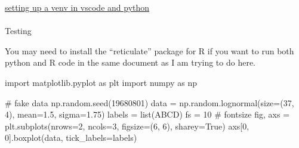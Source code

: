 \documentclass[
  letterpaper,
  DIV=11,
  numbers=noendperiod]{scrreprt}
\makeatletter
\let\oldparagraph\paragraph
\renewcommand{\paragraph}{
    \@ifstar
      \xxxParagraphStar
      \xxxParagraphNoStar
  }
\newcommand{\xxxParagraphStar}[1]{\oldparagraph*{#1}\mbox{}}
\newcommand{\xxxParagraphNoStar}[1]{\oldparagraph{#1}\mbox{}}
\newenvironment{Shaded}{\begin{snugshade}}{\end{snugshade}}
\newcommand{\BuiltInTok}[1]{\textcolor[rgb]{0.00,0.23,0.31}{#1}}
\newcommand{\CommentTok}[1]{\textcolor[rgb]{0.37,0.37,0.37}{#1}}
\newcommand{\DecValTok}[1]{\textcolor[rgb]{0.68,0.00,0.00}{#1}}
\newcommand{\FloatTok}[1]{\textcolor[rgb]{0.68,0.00,0.00}{#1}}
\newcommand{\ImportTok}[1]{\textcolor[rgb]{0.00,0.46,0.62}{#1}}
\newcommand{\NormalTok}[1]{\textcolor[rgb]{0.00,0.23,0.31}{#1}}
\newcommand{\OperatorTok}[1]{\textcolor[rgb]{0.37,0.37,0.37}{#1}}
\newcommand{\StringTok}[1]{\textcolor[rgb]{0.13,0.47,0.30}{#1}}
\newcommand{\VariableTok}[1]{\textcolor[rgb]{0.07,0.07,0.07}{#1}}
\makeatother
\begin{document}
\href{https://dev.to/emminex/how-to-install-python-libraries-in-visual-studio-code-38i1}{setting
up a venv in vscode and python}

\paragraph{Testing}\label{testing}

\begin{tcolorbox}[enhanced jigsaw, opacityback=0, leftrule=.75mm, colback=white, left=2mm, titlerule=0mm, toprule=.15mm, toptitle=1mm, coltitle=black, title=\textcolor{quarto-callout-warning-color}{\faExclamationTriangle}\hspace{0.5em}{Warning}, opacitybacktitle=0.6, colbacktitle=quarto-callout-warning-color!10!white, breakable, bottomrule=.15mm, bottomtitle=1mm, colframe=quarto-callout-warning-color-frame, arc=.35mm, rightrule=.15mm]

You may need to install the ``reticulate'' package for R if you want to
run both python and R code in the same document as I am trying to do
here.

\end{tcolorbox}

\begin{Shaded}
\begin{Highlighting}[]
\ImportTok{import}\NormalTok{ matplotlib.pyplot }\ImportTok{as}\NormalTok{ plt}
\ImportTok{import}\NormalTok{ numpy }\ImportTok{as}\NormalTok{ np}

\CommentTok{\# fake data}
\NormalTok{np.random.seed(}\DecValTok{19680801}\NormalTok{)}
\NormalTok{data }\OperatorTok{=}\NormalTok{ np.random.lognormal(size}\OperatorTok{=}\NormalTok{(}\DecValTok{37}\NormalTok{, }\DecValTok{4}\NormalTok{), mean}\OperatorTok{=}\FloatTok{1.5}\NormalTok{, sigma}\OperatorTok{=}\FloatTok{1.75}\NormalTok{)}
\NormalTok{labels }\OperatorTok{=} \BuiltInTok{list}\NormalTok{(}\StringTok{\textquotesingle{}ABCD\textquotesingle{}}\NormalTok{)}
\NormalTok{fs }\OperatorTok{=} \DecValTok{10}  \CommentTok{\# fontsize}
\NormalTok{fig, axs }\OperatorTok{=}\NormalTok{ plt.subplots(nrows}\OperatorTok{=}\DecValTok{2}\NormalTok{, ncols}\OperatorTok{=}\DecValTok{3}\NormalTok{, figsize}\OperatorTok{=}\NormalTok{(}\DecValTok{6}\NormalTok{, }\DecValTok{6}\NormalTok{), sharey}\OperatorTok{=}\VariableTok{True}\NormalTok{)}
\NormalTok{axs[}\DecValTok{0}\NormalTok{, }\DecValTok{0}\NormalTok{].boxplot(data, tick\_labels}\OperatorTok{=}\NormalTok{labels)}
\end{Highlighting}
\end{Shaded}
\end{document}

